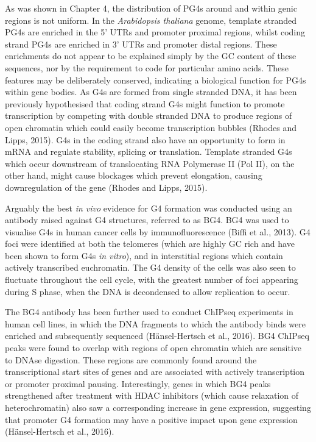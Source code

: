 \documentclass[12pt,a4paper,]{report}
\begin{document}
As was shown in Chapter 4, the distribution of PG4s around and within
genic regions is not uniform. In the \emph{Arabidopsis thaliana} genome,
template stranded PG4s are enriched in the 5' UTRs and promoter proximal
regions, whilst coding strand PG4s are enriched in 3' UTRs and promoter
distal regions. These enrichments do not appear to be explained simply
by the GC content of these sequences, nor by the requirement to code for
particular amino acids. These features may be deliberately conserved,
indicating a biological function for PG4s within gene bodies. As G4s are
formed from single stranded DNA, it has been previously hypothesised
that coding strand G4s might function to promote transcription by
competing with double stranded DNA to produce regions of open chromatin
which could easily become transcription bubbles (Rhodes and Lipps,
2015). G4s in the coding strand also have an opportunity to form in mRNA
and regulate stability, splicing or translation. Template stranded G4s
which occur downstream of translocating RNA Polymerase II (Pol II), on
the other hand, might cause blockages which prevent elongation, causing
downregulation of the gene (Rhodes and Lipps, 2015).

Arguably the best \emph{in vivo} evidence for G4 formation was conducted
using an antibody raised against G4 structures, referred to as BG4. BG4
was used to visualise G4s in human cancer cells by immunofluorescence
(Biffi et al., 2013). G4 foci were identified at both the telomeres
(which are highly GC rich and have been shown to form G4s \emph{in
vitro}), and in interstitial regions which contain actively transcribed
euchromatin. The G4 density of the cells was also seen to fluctuate
throughout the cell cycle, with the greatest number of foci appearing
during S phase, when the DNA is decondensed to allow replication to
occur.

The BG4 antibody has been further used to conduct ChIPseq experiments in
human cell lines, in which the DNA fragments to which the antibody binds
were enriched and subsequently sequenced (Hänsel-Hertsch et al., 2016).
BG4 ChIPseq peaks were found to overlap with regions of open chromatin
which are sensitive to DNAse digestion. These regions are commonly found
around the transcriptional start sites of genes and are associated with
actively transcription or promoter proximal pausing. Interestingly,
genes in which BG4 peaks strengthened after treatment with HDAC
inhibitors (which cause relaxation of heterochromatin) also saw a
corresponding increase in gene expression, suggesting that promoter G4
formation may have a positive impact upon gene expression
(Hänsel-Hertsch et al., 2016).
\end{document}
